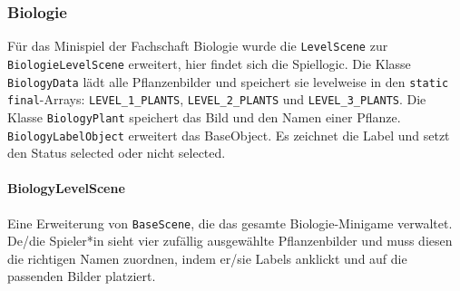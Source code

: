 \subsubsection{Biologie}

\begin{sloppypar}
    Für das Minispiel der Fachschaft Biologie wurde die \texttt{LevelScene} zur \texttt{BiologieLevelScene} erweitert, hier findet sich die Spiellogic.
    Die Klasse \texttt{BiologyData} lädt alle Pflanzenbilder und speichert sie levelweise in den \texttt{static final}-Arrays: \texttt{LEVEL\_1\_PLANTS}, \texttt{LEVEL\_2\_PLANTS} und \texttt{LEVEL\_3\_PLANTS}.
    Die Klasse \texttt{BiologyPlant} speichert das Bild und den Namen einer Pflanze.
    \texttt{BiologyLabelObject} erweitert das BaseObject. Es zeichnet die Label und setzt den Status selected oder nicht selected.
\end{sloppypar}

\paragraph{BiologyLevelScene}
Eine Erweiterung von \texttt{BaseScene}, die das gesamte Biologie-Minigame verwaltet.
De/die Spieler*in sieht vier zufällig ausgewählte Pflanzenbilder und muss diesen die richtigen Namen zuordnen, indem er/sie Labels anklickt und auf die passenden Bilder platziert.


